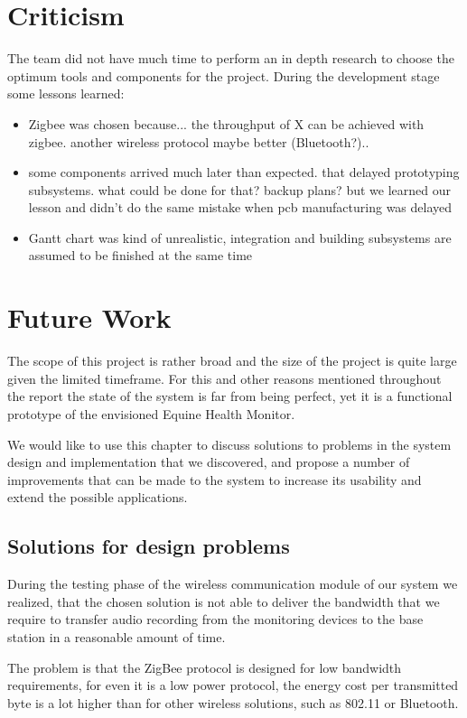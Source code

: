 \section{Criticism}
The team did not have much time to perform an in depth research to choose the optimum tools and components for the project. During the development stage some lessons learned:
\TODO{}
\begin{itemize}
\item Zigbee was chosen because... the throughput of X can be achieved with zigbee. another wireless protocol maybe better (Bluetooth?)..
\item some components arrived much later than expected. that delayed prototyping subsystems. what could be done for that? backup plans? but we learned our lesson and didn’t do the same mistake when pcb manufacturing was delayed
\item Gantt chart was kind of unrealistic, integration and building subsystems are assumed to be finished at the same time
\end{itemize}


\section{Future Work}
\label{chap:future_work}
The scope of this project is rather broad and the size of the project is quite large given the limited timeframe. For this and other reasons mentioned throughout the report the state of the system is far from being perfect, yet it is a functional prototype of the envisioned Equine Health Monitor. 

We would like to use this chapter to discuss solutions to problems in the system design and implementation that we discovered, and propose a number of improvements that can be made to the system to increase its usability and extend the possible applications.


\subsection{Solutions for design problems}
During the testing phase of the wireless communication module of our system we realized, that the chosen solution is not able to deliver the bandwidth that we require to transfer audio recording from the monitoring devices to the base station in a reasonable amount of time. 

The problem is that the ZigBee protocol is designed for low bandwidth requirements, for even it is a low power protocol, the energy cost per transmitted byte is a lot higher than for other wireless solutions, such as 802.11 or Bluetooth.


